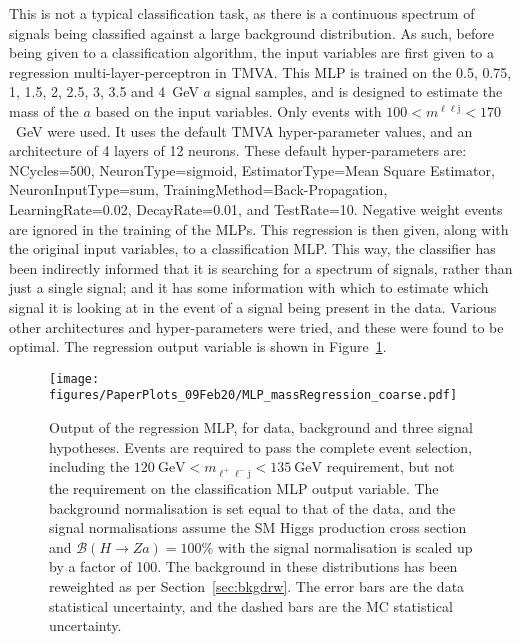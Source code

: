 \documentclass[NOTE, atlasdraft=true, texlive=2017, UKenglish]{\ATLASLATEXPATH atlasdoc}
\begin{document}
This is not a typical classification task, as there is a continuous spectrum of signals being classified against a large background distribution. As such, before being given to a classification algorithm, the input variables are first given to a regression multi-layer-perceptron in \textsc{TMVA}. This MLP is trained on the 0.5, 0.75, 1, 1.5, 2, 2.5, 3, 3.5 and 4~GeV $a$ signal samples, and is designed to estimate the mass of the $a$ based on the input variables. Only events with $100<m^{\ell\ell\text{j}}<170$~GeV were used. It uses the default \textsc{TMVA} hyper-parameter values, and an architecture of 4 layers of 12 neurons. These default hyper-parameters are: NCycles=500, NeuronType=sigmoid, EstimatorType=Mean Square Estimator, NeuronInputType=sum, TrainingMethod=Back-Propagation, LearningRate=0.02, DecayRate=0.01, and TestRate=10. Negative weight events are ignored in the training of the MLPs. This regression is then given, along with the original input variables, to a classification MLP. This way, the classifier has been indirectly informed that it is searching for a spectrum of signals, rather than just a single signal; and it has some information with which to estimate which signal it is looking at in the event of a signal being present in the data. Various other architectures and hyper-parameters were tried, and these were found to be optimal. The regression output variable is shown in Figure~\ref{fig:mlpregression}.


\begin{figure}[!htbp]
  \centering
  \texttt{[image: figures/PaperPlots\_09Feb20/MLP\_massRegression\_coarse.pdf]}
  \caption{Output of the regression MLP, for data, background and three signal hypotheses. Events are required to pass the complete event selection, including the $120~\text{GeV}<m_{\ell^+\ell^-\text{j}}<135~\text{GeV}$ requirement, but not the requirement on the classification MLP output variable. The background normalisation is set equal to that of the data, and the signal normalisations assume the SM Higgs production cross section and $\mathcal{B}(H\to Za)=100\%$ with the signal normalisation is scaled up by a factor of 100. The background in these distributions has been reweighted as per Section~\ref{sec:bkgdrw}. The error bars are the data statistical uncertainty, and the dashed bars are the MC statistical uncertainty.}
  \label{fig:mlpregression}
\end{figure}
\end{document}
